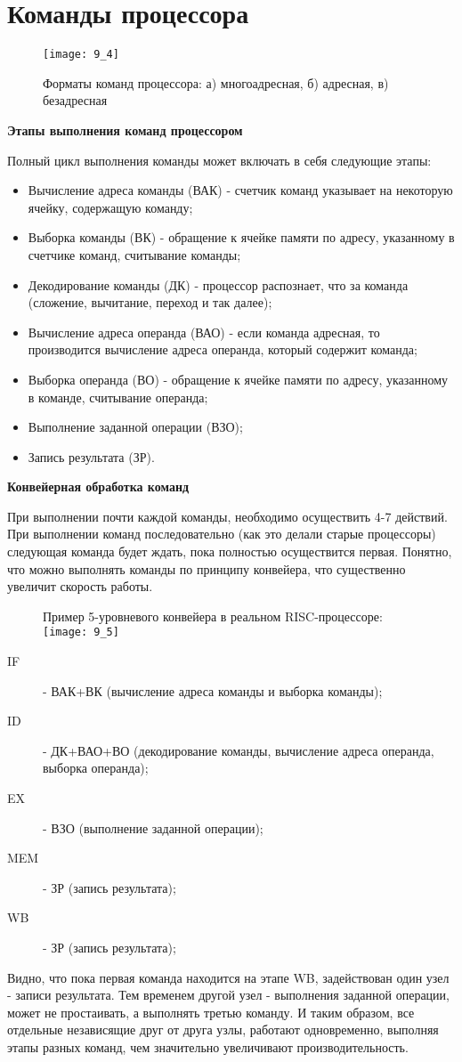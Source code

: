 \section{Команды процессора}
\begin{figure}[h]
\centering
\texttt{[image: 9\_4]}
\caption{Форматы команд процессора: а) многоадресная, б) адресная, в) безадресная}
\end{figure}
\begin{center}
  \textbf{Этапы выполнения команд процессором}
\end{center}
Полный цикл выполнения команды может включать в себя следующие этапы:
\begin{itemize}
  \item Вычисление адреса команды (ВАК) - счетчик команд указывает на некоторую ячейку, содержащую команду;
  \item Выборка команды (ВК) - обращение к ячейке памяти по адресу, указанному в счетчике команд, считывание команды;
  \item Декодирование команды (ДК) - процессор распознает, что за команда (сложение, вычитание, переход и так далее);
  \item Вычисление адреса операнда (ВАО) - если команда адресная, то производится вычисление адреса операнда, который содержит команда;
  \item Выборка операнда (ВО) - обращение к ячейке памяти по адресу, указанному в команде, считывание операнда;
  \item Выполнение заданной операции (ВЗО);
  \item Запись результата (ЗР).
\end{itemize}
\begin{center}
  \textbf{Конвейерная обработка команд}
\end{center}
При выполнении почти каждой команды, необходимо осуществить 4-7 действий. При выполнении команд последовательно (как это делали старые процессоры) следующая команда будет ждать, пока полностью осуществится первая. Понятно, что можно выполнять команды по принципу конвейера, что существенно увеличит скорость работы.
\begin{figure}[h]
\centering
Пример 5-уровневого конвейера в реальном RISC-процессоре:
\texttt{[image: 9\_5]}
\end{figure}
\begin{description}
  \item[IF] - ВАК+ВК (вычисление адреса команды и выборка команды);
  \item[ID] - ДК+ВАО+ВО (декодирование команды, вычисление адреса операнда, выборка операнда);
  \item[EX] - ВЗО (выполнение заданной операции);
  \item[MEM] - ЗР (запись результата);
  \item[WB] - ЗР (запись результата);
\end{description}
Видно, что пока первая команда находится на этапе WB, задействован один узел - записи результата. Тем временем другой узел - выполнения заданной операции, может не простаивать, а выполнять третью команду. И таким образом, все отдельные независящие друг от друга узлы, работают одновременно, выполняя этапы разных команд, чем значительно увеличивают производительность.
